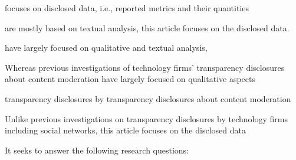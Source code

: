 \documentclass[nonacm,screen]{acmart}
\begin{document}
focuses on disclosed data, i.e., reported metrics and their
quantities

are mostly based on textual analysis, this
article focuses on the disclosed data.


have largely focused on qualitative
and textual analysis,


Whereas previous investigations of technology firms' transparency
disclosures about content moderation have largely focused on qualitative
aspects


transparency disclosures by
transparency disclosures about content moderation


Unlike previous investigations on transparency disclosures by
technology firms including social networks, this article focuses on the
disclosed data


It seeks to answer the following research questions:
\end{document}

